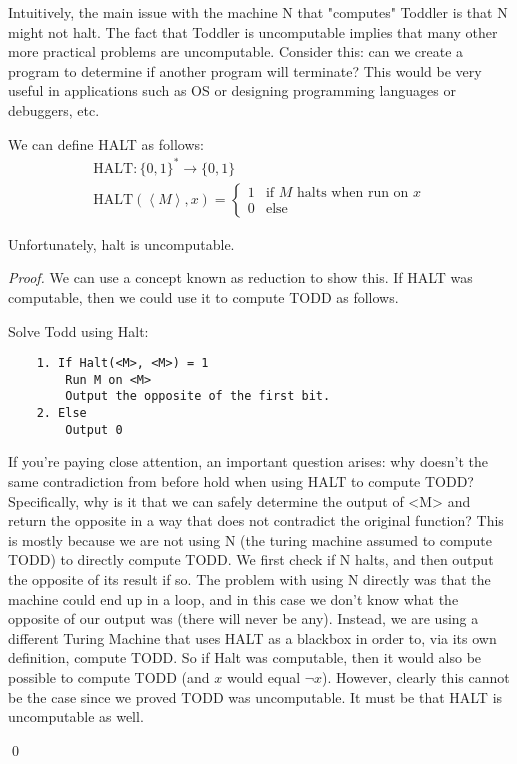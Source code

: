 Intuitively, the main issue with the machine N that "computes" Toddler is that N might not halt. The fact that Toddler is uncomputable implies that many other more practical problems are uncomputable. Consider this: can we create a program to determine if another program will terminate? This would be very useful in applications such as OS or designing programming languages or debuggers, etc. 

We can define HALT as follows:
\begin{gather*}
    \text{HALT}: \{0, 1\}^* \rightarrow \{0, 1\} \\
    \text{HALT}(\left<M\right>, x) = \begin{cases}
        1 & \text{if $M$ halts when run on $x$} \\
        0 & \text{else}
    \end{cases}
\end{gather*}

Unfortunately, halt is uncomputable.

\begin{proof}
    
    We can use a concept known as reduction to show this. If HALT was computable, then we could use it to compute TODD as follows.

    Solve Todd using Halt:
    \begin{verbatim}
    1. If Halt(<M>, <M>) = 1
        Run M on <M>
        Output the opposite of the first bit.
    2. Else
        Output 0
    \end{verbatim}

    If you're paying close attention, an important question arises: why doesn't the same contradiction from before hold when using HALT to compute TODD? Specifically, why is it that we can safely determine the output of <M> and return the opposite in a way that does not contradict the original function? This is mostly because we are not using N (the turing machine assumed to compute TODD) to directly compute TODD. We first check if N halts, and then output the opposite of its result if so. The problem with using N directly was that the machine could end up in a loop, and in this case we don't know what the opposite of our output was (there will never be any). Instead, we are using a different Turing Machine that uses HALT as a blackbox in order to, via its own definition, compute TODD. So if Halt was computable, then it would also be possible to compute TODD (and $x$ would equal $\lnot x$). However, clearly this cannot be the case since we proved TODD was uncomputable. It must be that HALT is uncomputable as well. 
    
    \qed    

\end{proof}

